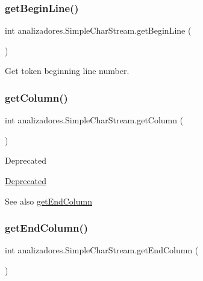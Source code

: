 \subsubsection{\texorpdfstring{get\+Begin\+Line()}{getBeginLine()}}
{\footnotesize\ttfamily int analizadores.\+Simple\+Char\+Stream.\+get\+Begin\+Line (\begin{DoxyParamCaption}{ }\end{DoxyParamCaption})}

Get token beginning line number. \mbox{\label{classanalizadores_1_1_simple_char_stream_ad9fd1239a7ecd61c0106e6863d8f81cd}} 
\subsubsection{\texorpdfstring{get\+Column()}{getColumn()}}
{\footnotesize\ttfamily int analizadores.\+Simple\+Char\+Stream.\+get\+Column (\begin{DoxyParamCaption}{ }\end{DoxyParamCaption})}

\begin{DoxyRefDesc}{Deprecated}
\item[\mbox{\hyperlink{deprecated__deprecated000001}{Deprecated}}]\end{DoxyRefDesc}
\begin{DoxySeeAlso}{See also}
\mbox{\hyperlink{classanalizadores_1_1_simple_char_stream_a3ab1da641448601061ce9a7ebea34708}{get\+End\+Column}} 
\end{DoxySeeAlso}
\mbox{\label{classanalizadores_1_1_simple_char_stream_a3ab1da641448601061ce9a7ebea34708}} 
\subsubsection{\texorpdfstring{get\+End\+Column()}{getEndColumn()}}
{\footnotesize\ttfamily int analizadores.\+Simple\+Char\+Stream.\+get\+End\+Column (\begin{DoxyParamCaption}{ }\end{DoxyParamCaption})}

